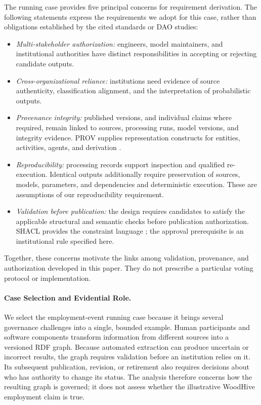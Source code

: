 \documentclass[journal]{IEEEtran}
\begin{document}
The running case provides five principal concerns for requirement
derivation. The following statements express the requirements
we adopt for this case, rather than obligations established
by the cited standards or DAO studies:
\begin{itemize}
    \item \emph{Multi-stakeholder authorization:}
    engineers, model maintainers, and institutional authorities
    have distinct responsibilities in accepting or rejecting
    candidate outputs.

    \item \emph{Cross-organizational reliance:}
    institutions need evidence of source authenticity,
    classification alignment, and the interpretation of
    probabilistic outputs.

    \item \emph{Provenance integrity:}
    published versions, and individual claims where required,
    remain linked to sources, processing runs, model versions,
    and integrity evidence. PROV supplies representation
    constructs for entities, activities, agents, and derivation
    \cite{Moreau2013PROV,Lebo2013PROVO}.

    \item \emph{Reproducibility:}
    processing records support inspection and qualified
    re-execution. Identical outputs additionally require
    preservation of sources, models, parameters, and dependencies
    and deterministic execution. These are assumptions of
    our reproducibility requirement.

    \item \emph{Validation before publication:}
    the design requires candidates to satisfy the applicable
    structural and semantic checks before publication
    authorization. SHACL provides the constraint language
    \cite{Knublauch2017SHACL}; the approval prerequisite
    is an institutional rule specified here.
\end{itemize}

Together, these concerns motivate the links among validation,
provenance, and authorization developed in this paper.
They do not prescribe a particular voting protocol
or implementation.

\paragraph{Case Selection and Evidential Role.}

We select the employment-event running case because it brings
several governance challenges into a single, bounded example.
Human participants and software components transform information
from different sources into a versioned RDF graph. Because
automated extraction can produce uncertain or incorrect results,
the graph requires validation before an institution relies on it.
Its subsequent publication, revision, or retirement also requires
decisions about who has authority to change its status. The
analysis therefore concerns how the resulting graph is governed;
it does not assess whether the illustrative WoodHive employment
claim is true.
\end{document}
